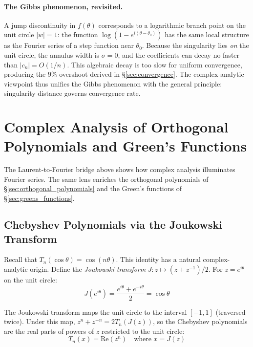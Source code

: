 \documentclass[12pt,a4paper]{report}
\theoremstyle{thms}
\theoremstyle{defns}
\begin{document}
\paragraph{The Gibbs phenomenon, revisited.} A jump discontinuity in $f(\theta)$ corresponds to a logarithmic branch point on the unit circle $|w| = 1$: the function $\log(1 - e^{i(\theta - \theta_0)})$ has the same local structure as the Fourier series of a step function near $\theta_0$. Because the singularity lies \textit{on} the unit circle, the annulus width is $\sigma = 0$, and the coefficients can decay no faster than $|c_n| = O(1/n)$. This algebraic decay is too slow for uniform convergence, producing the $9\%$ overshoot derived in \S\ref{sec:convergence}. The complex-analytic viewpoint thus unifies the Gibbs phenomenon with the general principle: singularity distance governs convergence rate.

\section{Complex Analysis of Orthogonal Polynomials and Green's Functions}
\label{sec:complex_orthogonal}

The Laurent-to-Fourier bridge above shows how complex analysis illuminates Fourier series. The same lens enriches the orthogonal polynomials of \S\ref{sec:orthogonal_polynomials} and the Green's functions of \S\ref{sec:greens_functions}.

\subsection{Chebyshev Polynomials via the Joukowski Transform}

Recall that $T_n(\cos\theta) = \cos(n\theta)$. This identity has a natural complex-analytic origin. Define the \textit{Joukowski transform} $J: z \mapsto (z + z^{-1})/2$. For $z = e^{i\theta}$ on the unit circle:
\begin{equation}
    J(e^{i\theta}) = \dfrac{e^{i\theta} + e^{-i\theta}}{2} = \cos\theta
\end{equation}

The Joukowski transform maps the unit circle to the interval $[-1, 1]$ (traversed twice). Under this map, $z^n + z^{-n} = 2T_n(J(z))$, so the Chebyshev polynomials are the real parts of powers of $z$ restricted to the unit circle:
\begin{equation}
    T_n(x) = \mathrm{Re}(z^n) \quad \text{where } x = J(z)
\end{equation}
\end{document}
